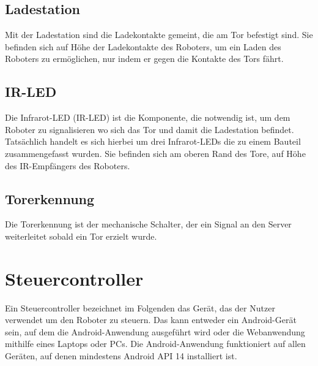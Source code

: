 \subsection{Ladestation}
Mit der Ladestation sind die Ladekontakte gemeint, die am Tor befestigt sind. Sie befinden sich auf Höhe der Ladekontakte des Roboters, um ein Laden des Roboters zu ermöglichen, nur indem er gegen die Kontakte des Tors fährt.

\subsection{IR-LED}
Die Infrarot-LED (IR-LED) ist die Komponente, die notwendig ist, um dem Roboter zu signalisieren wo sich das Tor und damit die Ladestation befindet. Tatsächlich handelt es sich hierbei um drei Infrarot-LEDs die zu einem Bauteil zusammengefasst wurden. Sie befinden sich am oberen Rand des Tore, auf Höhe des IR-Empfängers des Roboters.

\subsection{Torerkennung}
Die Torerkennung ist der mechanische Schalter, der ein Signal an den Server weiterleitet sobald ein Tor erzielt wurde. 

\section{Steuercontroller}
Ein Steuercontroller bezeichnet im Folgenden das Gerät, das der Nutzer verwendet um den Roboter zu steuern. Das kann entweder ein Android-Gerät sein, auf dem die Android-Anwendung ausgeführt wird oder die Webanwendung mithilfe eines Laptops oder PCs. Die Android-Anwendung funktioniert auf allen Geräten, auf denen mindestens Android API 14 installiert ist.
